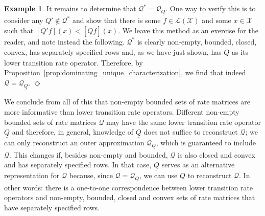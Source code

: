 \documentclass[10pt,a4paper]{paper}
\theoremstyle{definition}
\newtheorem{exmp}{Example}%
\newcommand{\states}{\mathcal{X}}
\newcommand{\gambles}{\mathcal{L}}
\newcommand{\gamblesX}{\gambles(\states)}
\newcommand{\rateset}{\mathcal{Q}}
\newcommand{\lrate}{\underline{Q}}
\newcommand{\coloneqq}{:\!=}
\newcommand{\exampleend}{\hfill$\Diamond$}
\begin{document}
\begin{exmp}

It remains to determine that $\rateset^*=\rateset_{\lrate}$. One way to verify this is to consider any $Q'\notin\rateset^*$ and show that there is some $f\in\gamblesX$ and some $x\in\states$ such that $[Q'f](x)<[\lrate f](x)$. We leave this method as an exercise for the reader, and note instead the following. $\rateset^*$ is clearly non-empty, bounded, closed, convex, has separately specified rows and, as we have just shown, has $\lrate$ as its lower transition rate operator. Therefore, by Proposition~\ref{prop:dominating_unique_characterization}, we find that indeed $\rateset=\rateset_{\lrate}$.
\exampleend
\end{exmp}

We conclude from all of this that non-empty bounded sets of rate matrices are more informative than lower transition rate operators. Different non-empty bounded sets of rate matrices $\rateset$ may have the same lower transition rate operator $\lrate$ and therefore, in general, knowledge of $\lrate$ does not suffice to reconstruct $\rateset$; we can only reconstruct an outer approximation $\rateset_{\lrate}$, which is guaranteed to include $\rateset$. This changes if, besides non-empty and bounded, $\rateset$ is also closed and convex and has separately specified rows. In that case, $\lrate$ serves as an alternative representation for $\rateset$ because, since $\rateset=\rateset_{\lrate}$, we can use $\lrate$ to reconstruct $\rateset$. In other words: there is a one-to-one correspondence between lower transition rate operators and non-empty, bounded, closed and convex sets of rate matrices that have separately specified rows.
\end{document}
